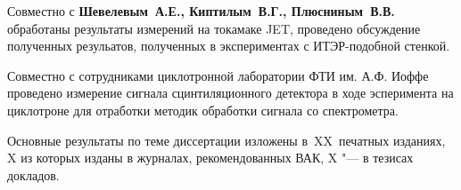 Совместно с \textbf{Шевелевым~А.Е., Киптилым~В.Г., Плюсниным~В.В.} обработаны результаты измерений на токамаке JET, проведено обсуждение полученных резульатов, полученных в экспериментах с ИТЭР-подобной стенкой.

Совместно с сотрудниками циклотронной лаборатории ФТИ им. А.Ф. Иоффе проведено измерение сигнала сцинтиляционного детектора в ходе эсперимента на циклотроне для отработки методик обработки сигнала со спектрометра.


{%
    {\publications} Основные результаты по теме диссертации изложены
    в~XX~печатных изданиях,
    X из которых изданы в журналах, рекомендованных ВАК,
    X "--- в тезисах докладов.
}%
